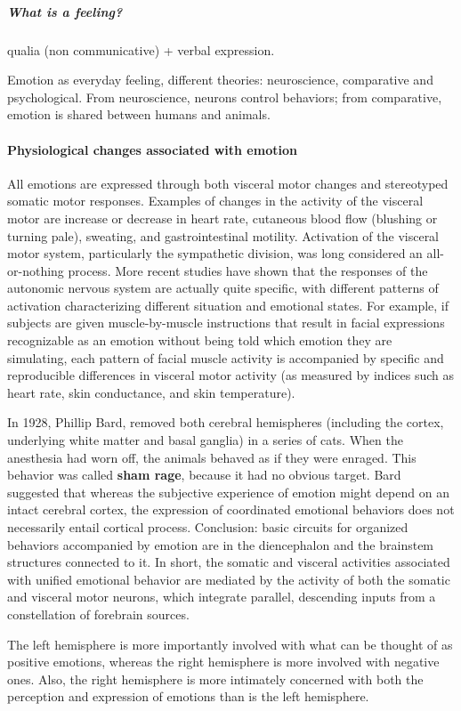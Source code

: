 \documentclass[12pt,article,oneside,a4paper]{memoir}
\begin{document}
\subparagraph{What is a feeling?}
qualia (non communicative) + verbal expression.

Emotion as everyday feeling, different theories: neuroscience, comparative and
psychological. From neuroscience, neurons control behaviors; from comparative, 
emotion is shared between humans and animals.

\paragraph{Physiological changes associated with emotion}
All emotions are expressed through both visceral motor changes and stereotyped
somatic motor responses. Examples of changes in the activity of the visceral
motor are increase or decrease in heart rate, cutaneous blood flow (blushing or
turning pale), sweating, and gastrointestinal motility.
Activation of the visceral motor system, particularly the sympathetic division,
was long considered an all-or-nothing process. More recent studies have shown
that the responses of the autonomic nervous system are actually quite specific,
with different patterns of activation characterizing different situation and
emotional states. For example, if subjects are given muscle-by-muscle
instructions that result in facial expressions recognizable as an emotion
without being told which emotion they are simulating, each pattern of facial
muscle activity is accompanied by specific and reproducible differences in
visceral motor activity (as measured by indices such as heart rate, skin
conductance, and skin temperature). 

In 1928, Phillip Bard, removed both cerebral hemispheres (including the cortex,
underlying white matter and basal ganglia) in a series of cats.
When the anesthesia had worn off, the animals behaved as if they were enraged.
This behavior was called \textbf{sham rage}, because it had no obvious target.
Bard suggested that whereas the subjective experience of emotion might depend
on an intact cerebral cortex, the expression of coordinated emotional behaviors
does not necessarily entail cortical process. Conclusion: basic circuits for
organized behaviors accompanied by emotion are in the diencephalon and the
brainstem structures connected to it.
In short, the somatic and visceral activities associated with unified emotional
behavior are mediated by the activity of both the somatic and visceral motor
neurons, which integrate parallel, descending inputs from a constellation of 
forebrain sources. 

The left hemisphere is more importantly involved with what can be thought of as
positive emotions, whereas the right hemisphere is more involved with negative
ones. Also, the right hemisphere is more intimately concerned with both the 
perception and expression of emotions than is the left hemisphere.
\end{document}
